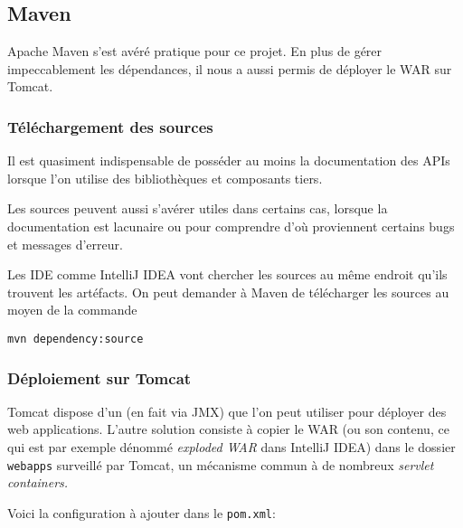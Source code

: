 \subsection{Maven}


Apache Maven s'est avéré pratique pour ce projet.
En plus de gérer impeccablement les dépendances, il nous a aussi
permis de déployer le WAR sur Tomcat.

\subsubsection{Téléchargement des sources}

Il est quasiment indispensable de posséder au moins la documentation
des APIs lorsque l'on utilise des bibliothèques et composants tiers.

Les sources peuvent aussi s'avérer utiles dans certains cas, 
lorsque la documentation est lacunaire ou pour comprendre
d'où proviennent certains bugs et messages d'erreur.

Les IDE comme IntelliJ IDEA vont chercher les sources au même endroit
qu'ils trouvent les artéfacts. On peut demander à Maven de télécharger
les sources au moyen de la commande 

\verb|mvn dependency:source|

\subsubsection{Déploiement sur Tomcat}

Tomcat dispose d'un  (en fait via JMX) que l'on peut utiliser
pour déployer des web applications. L'autre solution consiste à
copier le WAR (ou son contenu, ce qui est par exemple dénommé \emph{exploded WAR} dans IntelliJ IDEA) 
dans le dossier \verb|webapps| surveillé par Tomcat,
un mécanisme commun à de nombreux \emph{servlet containers.}

Voici la configuration à ajouter dans le \verb|pom.xml|:

